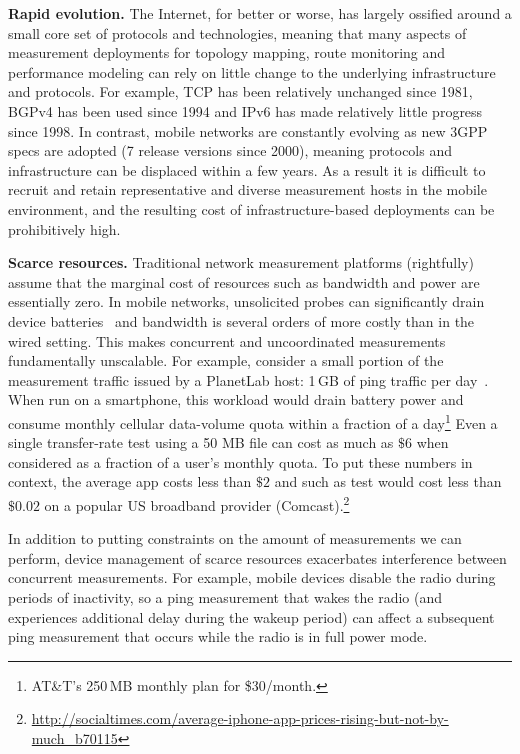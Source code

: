 \noindent\textbf{Rapid evolution.} The Internet, for better or worse, has 
largely ossified around a small core set of protocols and 
technologies, meaning that many aspects of measurement deployments for  
topology mapping, route monitoring and performance modeling 
can rely on little change to the underlying infrastructure 
and protocols. For example, TCP has been relatively unchanged since 1981, 
BGPv4 has been used since 1994 and IPv6 has made relatively little 
progress since 1998. In contrast, mobile networks are constantly 
evolving as new 3GPP specs are adopted (7 release versions since 2000), meaning protocols and 
infrastructure can be displaced within a few years. As a 
result it is difficult to recruit and retain representative and diverse 
measurement hosts in the mobile environment, and the resulting 
cost of infrastructure-based deployments can be prohibitively 
high. 

\noindent\textbf{Scarce resources.} Traditional network measurement 
platforms (rightfully) assume that the marginal cost of resources such as 
bandwidth and power are essentially zero. In mobile networks, 
unsolicited probes can significantly drain device batteries~\cite{wang:middleboxes} 
and bandwidth is several orders of more costly than in the 
wired setting. This makes concurrent and uncoordinated measurements fundamentally unscalable. 
For example, consider a small portion of the measurement traffic issued by a PlanetLab host: 1\,GB of 
ping traffic per day~\cite{nakao:underlay}. When run on a smartphone, this workload would drain 
battery power and consume monthly cellular data-volume quota within a fraction of a day\footnote{AT\&T's 250\,MB monthly plan for \$30/month.}
Even a single transfer-rate test using a 50 MB file 
can cost as much as $\$6$ when considered as a fraction of a user's monthly quota.
To put these numbers in context, the average app costs less than $\$2$
 and such as test would cost less 
than $\$0.02$ on a popular US broadband provider (Comcast).\footnote{\url{http://socialtimes.com/average-iphone-app-prices-rising-but-not-by-much_b70115}}

In addition to putting constraints on the amount of measurements we can perform, 
device management of scarce resources exacerbates interference between concurrent 
measurements. For example, mobile devices disable the radio during periods of 
inactivity, so a ping measurement that wakes the radio (and experiences additional 
delay during the wakeup period) can affect a subsequent ping measurement that 
occurs while the radio is in full power mode.

